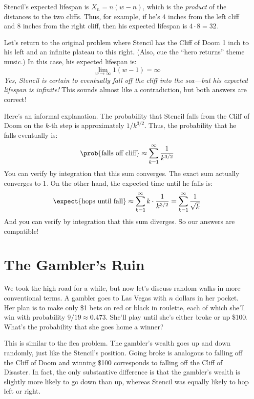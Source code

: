 Stencil's expected lifespan is $X_n = n (w - n)$, which is the
\emph{product} of the distances to the two cliffs.  Thus, for
example, if he's 4 inches from the left cliff and 8 inches from the
right cliff, then his expected lifespan is $4 \cdot 8 = 32$.

Let's return to the original problem where Stencil has the Cliff of
Doom 1 inch to his left and an infinite plateau to this right.  (Also,
cue the ``hero returns'' theme music.)  In this case, his expected
lifespan is:
%
\[
\lim_{w \to \infty} 1 (w - 1) = \infty
\]
%
\emph{Yes, Stencil is certain to eventually fall off the cliff into
the sea---but his expected lifespan is infinite!}  This sounds almost
like a contradiction, but both answers are correct!

Here's an informal explanation.  The probability that Stencil falls
from the Cliff of Doom on the $k$-th step is approximately $1 /
k^{3/2}$.  Thus, the probability that he falls eventually is:
%
\[
    \prob{\text{falls off cliff}} \approx \sum_{k=1}^{\infty} \frac{1}{k^{3/2}}
\]
%
You can verify by integration that this sum converges.  The exact sum
actually converges to 1.  On the other hand, the expected time until
he falls is:
%
\[
    \expect{\text{hops until fall}}
        \approx \sum_{k=1}^{\infty} k \cdot \frac{1}{k^{3/2}}
        = \sum_{k=1}^{\infty} \frac{1}{\sqrt{k}}
\]
%
And you can verify by integration that this sum diverges.  So our
answers are compatible!


\section{The Gambler's Ruin}

We took the high road for a while, but now let's discuss random walks
in more conventional terms.  A gambler goes to Las Vegas with $n$
dollars in her pocket.  Her plan is to make only \$1 bets on red or
black in roulette, each of which she'll win with probability $9/19
\approx 0.473$.  She'll play until she's either broke or up \$100.
What's the probability that she goes home a winner?

This is similar to the flea problem.  The gambler's wealth goes up and
down randomly, just like the Stencil's position.  Going broke is
analogous to falling off the Cliff of Doom and winning \$100
corresponds to falling off the Cliff of Disaster.  In fact, the only
substantive difference is that the gambler's wealth is slightly more
likely to go down than up, whereas Stencil was equally likely to hop
left or right.

